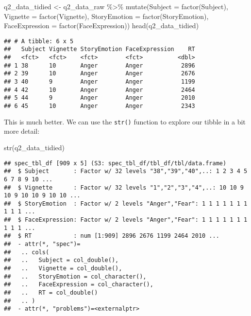 \documentclass[
]{article}
\newenvironment{Shaded}{\begin{snugshade}}{\end{snugshade}}
\newcommand{\AttributeTok}[1]{\textcolor[rgb]{0.77,0.63,0.00}{#1}}
\newcommand{\FunctionTok}[1]{\textcolor[rgb]{0.00,0.00,0.00}{#1}}
\newcommand{\NormalTok}[1]{#1}
\newcommand{\OtherTok}[1]{\textcolor[rgb]{0.56,0.35,0.01}{#1}}
\newcommand{\SpecialCharTok}[1]{\textcolor[rgb]{0.00,0.00,0.00}{#1}}
\begin{document}
\begin{Shaded}
\begin{Highlighting}[]
\NormalTok{q2\_data\_tidied }\OtherTok{\textless{}{-}}\NormalTok{ q2\_data\_raw }\SpecialCharTok{\%\textgreater{}\%} 
  \FunctionTok{mutate}\NormalTok{(}\AttributeTok{Subject =} \FunctionTok{factor}\NormalTok{(Subject),}
            \AttributeTok{Vignette =} \FunctionTok{factor}\NormalTok{(Vignette),}
            \AttributeTok{StoryEmotion =} \FunctionTok{factor}\NormalTok{(StoryEmotion),}
            \AttributeTok{FaceExpression =} \FunctionTok{factor}\NormalTok{(FaceExpression))}
\FunctionTok{head}\NormalTok{(q2\_data\_tidied)}
\end{Highlighting}
\end{Shaded}

\begin{verbatim}
## # A tibble: 6 x 5
##   Subject Vignette StoryEmotion FaceExpression    RT
##   <fct>   <fct>    <fct>        <fct>          <dbl>
## 1 38      10       Anger        Anger           2896
## 2 39      10       Anger        Anger           2676
## 3 40      9        Anger        Anger           1199
## 4 42      10       Anger        Anger           2464
## 5 44      9        Anger        Anger           2010
## 6 45      10       Anger        Anger           2343
\end{verbatim}

This is much better. We can use the \texttt{str()} function to explore
our tibble in a bit more detail:

\begin{Shaded}
\begin{Highlighting}[]
\FunctionTok{str}\NormalTok{(q2\_data\_tidied)}
\end{Highlighting}
\end{Shaded}

\begin{verbatim}
## spec_tbl_df [909 x 5] (S3: spec_tbl_df/tbl_df/tbl/data.frame)
##  $ Subject       : Factor w/ 32 levels "38","39","40",..: 1 2 3 4 5 6 7 8 9 10 ...
##  $ Vignette      : Factor w/ 32 levels "1","2","3","4",..: 10 10 9 10 9 10 10 9 10 10 ...
##  $ StoryEmotion  : Factor w/ 2 levels "Anger","Fear": 1 1 1 1 1 1 1 1 1 1 ...
##  $ FaceExpression: Factor w/ 2 levels "Anger","Fear": 1 1 1 1 1 1 1 1 1 1 ...
##  $ RT            : num [1:909] 2896 2676 1199 2464 2010 ...
##  - attr(*, "spec")=
##   .. cols(
##   ..   Subject = col_double(),
##   ..   Vignette = col_double(),
##   ..   StoryEmotion = col_character(),
##   ..   FaceExpression = col_character(),
##   ..   RT = col_double()
##   .. )
##  - attr(*, "problems")=<externalptr>
\end{verbatim}
\end{document}
